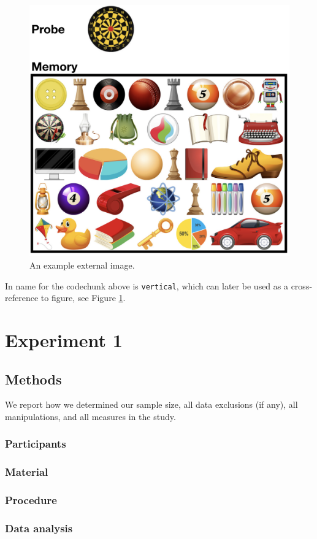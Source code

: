 \documentclass[
  man]{apa6}
\begin{document}
\begin{figure}
\includegraphics[width=0.5\linewidth]{external_image} \caption{An example external image.}\label{fig:vertical}
\end{figure}

In name for the codechunk above is \texttt{vertical}, which can later be used as a cross-reference to figure, see Figure \ref{fig:vertical}.

\hypertarget{experiment-1}{%
\section{Experiment 1}\label{experiment-1}}

\hypertarget{methods}{%
\subsection{Methods}\label{methods}}

We report how we determined our sample size, all data exclusions (if any), all manipulations, and all measures in the study.

\hypertarget{participants}{%
\subsubsection{Participants}\label{participants}}

\hypertarget{material}{%
\subsubsection{Material}\label{material}}

\hypertarget{procedure}{%
\subsubsection{Procedure}\label{procedure}}

\hypertarget{data-analysis}{%
\subsubsection{Data analysis}\label{data-analysis}}
\end{document}
